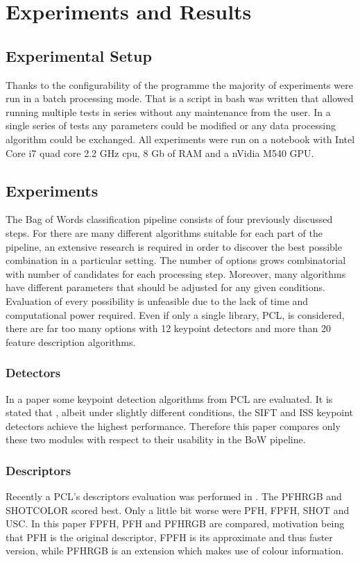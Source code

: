 \chapter{Experiments and Results}

\section{Experimental Setup}
	Thanks to the configurability of the programme the majority of experiments were run in a batch processing mode. That is a script in bash was written that allowed running multiple tests in series without any maintenance from the user. In a single series of tests any parameters could be modified or any data processing algorithm could be exchanged. All experiments were run on a notebook with Intel Core i7 quad core 2.2 GHz cpu, 8 Gb of RAM and a nVidia M540 GPU.

\section{Experiments}
	The Bag of Words classification pipeline consists of four previously discussed steps. For there are many different algorithms suitable for each part of the pipeline, an extensive research is required in order to discover the best possible combination in a particular setting. The number of options grows combinatorial with number of candidates for each processing step. Moreover, many algorithms have different parameters that should be adjusted for any given conditions. Evaluation of every possibility is unfeasible due to the lack of time and computational power required. Even if only a single library, PCL, is considered, there are far too many options with 12 keypoint detectors and more than 20 feature description algorithms. 
	
	\subsection{Detectors}
	In a paper \cite{pcl_keypoint_comparision} some keypoint detection algorithms from PCL are evaluated. It is stated that , albeit under slightly different conditions, the SIFT and ISS keypoint detectors achieve the highest performance. Therefore this paper compares only these two modules with respect to their usability in the BoW pipeline. 

	\subsection{Descriptors}
	Recently a PCL's descriptors evaluation was performed in \cite{pcl_features}. The PFHRGB and SHOTCOLOR scored best. Only a little bit worse were PFH, FPFH, SHOT and USC. In this paper FPFH, PFH and PFHRGB are compared, motivation being that PFH is the original descriptor, FPFH is its approximate and thus faster version, while PFHRGB is an extension which makes use of colour information.
		
